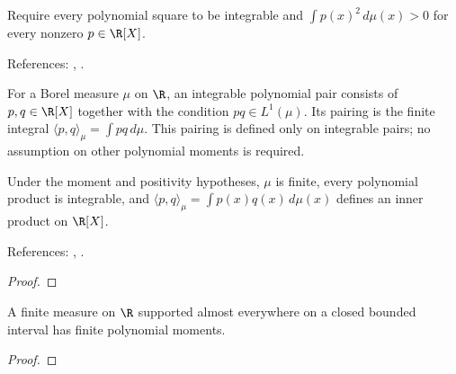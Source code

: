 \begin{definition}
\label{def:polynomial-positive}
\leanok
Require every polynomial square to be integrable and $\int p(x)^2\,d\mu(x)>0$ for every nonzero $p\in\R[X]$.

References: \cite[18.2(i)]{dlmf}, \cite[Chapter 3]{szego}.
\end{definition}

\begin{definition}
\label{def:polynomial-integrable-pair}
\leanok
For a Borel measure $\mu$ on $\R$, an integrable polynomial pair consists of
$p,q\in\R[X]$ together with the condition $pq\in L^1(\mu)$.
Its pairing is the finite integral $\langle p,q\rangle_\mu=\int pq\,d\mu$.
This pairing is defined only on integrable pairs; no assumption on other
polynomial moments is required.
\end{definition}

\begin{theorem}
\label{thm:polynomial-inner}
\leanok
Under the moment and positivity hypotheses, $\mu$ is finite, every polynomial
product is integrable, and $\langle p,q\rangle_\mu=\int p(x)q(x)\,d\mu(x)$
defines an inner product on $\R[X]$.

References: \cite[18.2(i)]{dlmf}, \cite[Chapter 3]{szego}.
\end{theorem}
\begin{proof}
\leanok
\end{proof}

\begin{theorem}
\label{thm:compact-polynomial-moments}
\leanok
A finite measure on $\R$ supported almost everywhere on a closed bounded
interval has finite polynomial moments.
\end{theorem}
\begin{proof}
\leanok
\end{proof}

